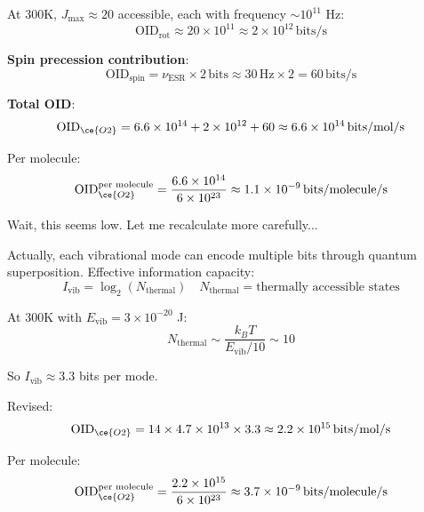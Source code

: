\documentclass[11pt,onecolumn]{article}
\begin{document}
At 300K, $J_{\max} \approx 20$ accessible, each with frequency $\sim 10^{11}$ Hz:
\begin{equation}
\text{OID}_{\text{rot}} \approx 20 \times 10^{11} \approx 2 \times 10^{12}\,\text{bits/s}
\end{equation}

\textbf{Spin precession contribution}:
\begin{equation}
\text{OID}_{\text{spin}} = \nu_{\text{ESR}} \times 2\,\text{bits} \approx 30\,\text{Hz} \times 2 = 60\,\text{bits/s}
\end{equation}

\textbf{Total OID}:
\begin{equation}
\text{OID}_{\ce{O2}} = 6.6 \times 10^{14} + 2 \times 10^{12} + 60 \approx 6.6 \times 10^{14}\,\text{bits/mol/s}
\end{equation}

Per molecule:
\begin{equation}
\text{OID}_{\ce{O2}}^{\text{per molecule}} = \frac{6.6 \times 10^{14}}{6 \times 10^{23}} \approx 1.1 \times 10^{-9}\,\text{bits/molecule/s}
\end{equation}

Wait, this seems low. Let me recalculate more carefully...

Actually, each vibrational mode can encode multiple bits through quantum superposition. Effective information capacity:
\begin{equation}
I_{\text{vib}} = \log_2(N_{\text{thermal}}) \quad N_{\text{thermal}} = \text{thermally accessible states}
\end{equation}

At 300K with $E_{\text{vib}} = 3 \times 10^{-20}$ J:
\begin{equation}
N_{\text{thermal}} \sim \frac{k_B T}{E_{\text{vib}}/10} \sim 10
\end{equation}

So $I_{\text{vib}} \approx 3.3$ bits per mode.

Revised:
\begin{equation}
\text{OID}_{\ce{O2}} = 14 \times 4.7 \times 10^{13} \times 3.3 \approx 2.2 \times 10^{15}\,\text{bits/mol/s}
\end{equation}

Per molecule:
\begin{equation}
\text{OID}_{\ce{O2}}^{\text{per molecule}} = \frac{2.2 \times 10^{15}}{6 \times 10^{23}} \approx 3.7 \times 10^{-9}\,\text{bits/molecule/s}
\end{equation}
\end{document}
